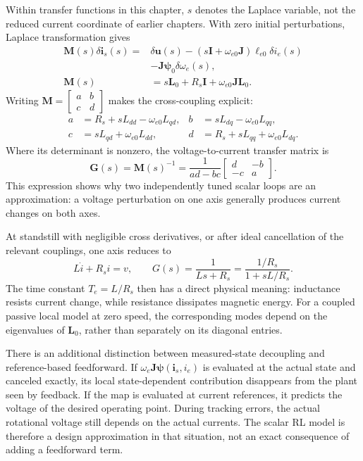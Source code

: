 Within transfer functions in this chapter, $s$ denotes the Laplace variable, not the reduced current coordinate of earlier chapters. With zero initial perturbations, Laplace transformation gives
\begin{align}
 \bm M(s)\delta\bm i_s(s)
 ={}&\delta\bm u(s)
 -(s\bm I+\omega_{e0}\bm J)\bm\ell_{e0}\delta i_e(s)
 \nonumber\\
 &-\bm J\bm\psi_0\delta\omega_e(s),\\
 \bm M(s)&=s\bm L_0+R_s\bm I+\omega_{e0}\bm J\bm L_0.
 \label{eq:control-matrix-plant}
\end{align}
Writing $\bm M=\left[\begin{smallmatrix}a&b\\c&d\end{smallmatrix}\right]$ makes the cross-coupling explicit:
\begin{align}
 a&=R_s+sL_{dd}-\omega_{e0}L_{qd},&
 b&=sL_{dq}-\omega_{e0}L_{qq},\\
 c&=sL_{qd}+\omega_{e0}L_{dd},&
 d&=R_s+sL_{qq}+\omega_{e0}L_{dq}.
\end{align}
Where its determinant is nonzero, the voltage-to-current transfer matrix is
\begin{equation}
 \bm G(s)=\bm M(s)^{-1}
 =\frac{1}{ad-bc}\begin{bmatrix}d&-b\\-c&a\end{bmatrix}.
 \label{eq:control-transfer-inverse}
\end{equation}
This expression shows why two independently tuned scalar loops are an approximation: a voltage perturbation on one axis generally produces current changes on both axes.

At standstill with negligible cross derivatives, or after ideal cancellation of the relevant couplings, one axis reduces to
\begin{equation}
 L\dot i+R_si=v,
 \qquad G(s)=\frac{1}{Ls+R_s}
 =\frac{1/R_s}{1+sL/R_s}.
 \label{eq:control-rl}
\end{equation}
The time constant $T_e=L/R_s$ then has a direct physical meaning: inductance resists current change, while resistance dissipates magnetic energy. For a coupled passive local model at zero speed, the corresponding modes depend on the eigenvalues of $\bm L_0$, rather than separately on its diagonal entries.

There is an additional distinction between measured-state decoupling and reference-based feedforward. If $\omega_e\bm J\bm\psi(\bm i_s,i_e)$ is evaluated at the actual state and canceled exactly, its local state-dependent contribution disappears from the plant seen by feedback. If the map is evaluated at current references, it predicts the voltage of the desired operating point. During tracking errors, the actual rotational voltage still depends on the actual currents. The scalar RL model is therefore a design approximation in that situation, not an exact consequence of adding a feedforward term.

